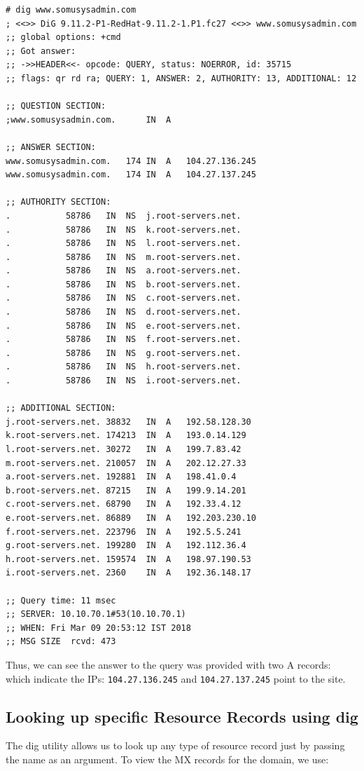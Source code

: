\vspace{-15pt}
\begin{verbatim}
# dig www.somusysadmin.com
; <<>> DiG 9.11.2-P1-RedHat-9.11.2-1.P1.fc27 <<>> www.somusysadmin.com
;; global options: +cmd
;; Got answer:
;; ->>HEADER<<- opcode: QUERY, status: NOERROR, id: 35715
;; flags: qr rd ra; QUERY: 1, ANSWER: 2, AUTHORITY: 13, ADDITIONAL: 12

;; QUESTION SECTION:
;www.somusysadmin.com.		IN	A

;; ANSWER SECTION:
www.somusysadmin.com.	174	IN	A	104.27.136.245
www.somusysadmin.com.	174	IN	A	104.27.137.245

;; AUTHORITY SECTION:
.			58786	IN	NS	j.root-servers.net.
.			58786	IN	NS	k.root-servers.net.
.			58786	IN	NS	l.root-servers.net.
.			58786	IN	NS	m.root-servers.net.
.			58786	IN	NS	a.root-servers.net.
.			58786	IN	NS	b.root-servers.net.
.			58786	IN	NS	c.root-servers.net.
.			58786	IN	NS	d.root-servers.net.
.			58786	IN	NS	e.root-servers.net.
.			58786	IN	NS	f.root-servers.net.
.			58786	IN	NS	g.root-servers.net.
.			58786	IN	NS	h.root-servers.net.
.			58786	IN	NS	i.root-servers.net.

;; ADDITIONAL SECTION:
j.root-servers.net.	38832	IN	A	192.58.128.30
k.root-servers.net.	174213	IN	A	193.0.14.129
l.root-servers.net.	30272	IN	A	199.7.83.42
m.root-servers.net.	210057	IN	A	202.12.27.33
a.root-servers.net.	192881	IN	A	198.41.0.4
b.root-servers.net.	87215	IN	A	199.9.14.201
c.root-servers.net.	68790	IN	A	192.33.4.12
e.root-servers.net.	86889	IN	A	192.203.230.10
f.root-servers.net.	223796	IN	A	192.5.5.241
g.root-servers.net.	199280	IN	A	192.112.36.4
h.root-servers.net.	159574	IN	A	198.97.190.53
i.root-servers.net.	2360	IN	A	192.36.148.17

;; Query time: 11 msec
;; SERVER: 10.10.70.1#53(10.10.70.1)
;; WHEN: Fri Mar 09 20:53:12 IST 2018
;; MSG SIZE  rcvd: 473
\end{verbatim}
\vspace{-10pt}	

\noindent
Thus, we can see the answer to the query was provided with two A records: which indicate the IPs: \verb|104.27.136.245| and \verb|104.27.137.245| point to the site. 

\subsection{Looking up specific Resource Records using dig}
The dig utility allows us to look up any type of resource record just by passing the name as an argument. To view the MX records for the domain, we use:

